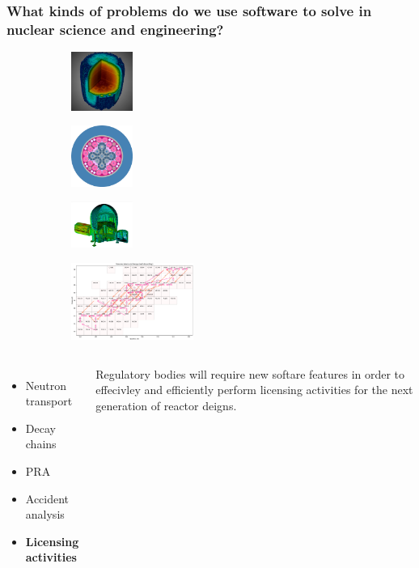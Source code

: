 \begin{frame}
    \frametitle{What kinds of problems do we use software to solve in nuclear science and engineering?}

    \begin{figure}[htpb]
        \begin{subfigure}
            \centering
            \includegraphics[width=2cm]{images/exasmr.png}
        \end{subfigure}
        \begin{subfigure}
           \centering
           \includegraphics[width=2cm]{images/atr.png} 
        \end{subfigure}
        \begin{subfigure}
           \centering
           \includegraphics[width=2cm]{images/hab1.png} 
        \end{subfigure}
        \begin{subfigure}
            \centering
            \includegraphics[width=4cm]{images/transmutation.png}
        \end{subfigure}
    \end{figure}
    \pause\medskip
    \begin{columns}
        \column[t]{5cm}
        \begin{itemize}
            \item Neutron transport
            \item Decay chains
            \item PRA
            \item Accident analysis
            \item {\bf Licensing activities}
        \end{itemize}

        \column[t]{5cm}
        Regulatory bodies will require new softare features in order to effecivley and efficiently perform licensing activities for the next generation of reactor deigns.
    \end{columns}

\end{frame}

